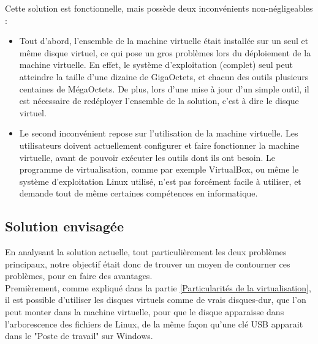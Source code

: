 Cette solution est fonctionnelle, mais possède deux inconvénients non-négligeables :
\begin{itemize}
	\item Tout d'abord, l'ensemble de la machine virtuelle était installée sur un seul et même disque virtuel, ce qui pose un gros problèmes lors du déploiement de la machine virtuelle.
En effet, le système d'exploitation (complet) seul peut atteindre la taille d'une dizaine de GigaOctets, et chacun des outils plusieurs centaines de MégaOctets.
De plus, lors d'une mise à jour d'un simple outil, il est nécessaire de redéployer l'ensemble de la solution, c'est à dire le disque virtuel.
	\item Le second inconvénient repose sur l'utilisation de la machine virtuelle.
Les utilisateurs doivent actuellement configurer et faire fonctionner la machine virtuelle, avant de pouvoir exécuter les outils dont ils ont besoin.
Le programme de virtualisation, comme par exemple VirtualBox, ou même le système d'exploitation Linux utilisé, n'est pas forcément facile à utiliser, et demande tout de même certaines compétences en informatique.
\\
\end{itemize}




\subsection{Solution envisagée}
\label{Solution envisagée}

En analysant la solution actuelle, tout particulièrement les deux problèmes principaux, notre objectif était donc de trouver un moyen de contourner ces problèmes, pour en faire des avantages.
\\


Premièrement, comme expliqué dans la partie \ref{Particularités de la virtualisation}, il est possible d'utiliser les disques virtuels comme de vrais disques-dur, que l'on peut monter dans la machine virtuelle, pour que le disque apparaisse dans l'arborescence des fichiers de Linux, de la même façon qu'une clé USB apparait dans le "Poste de travail" sur Windows.

